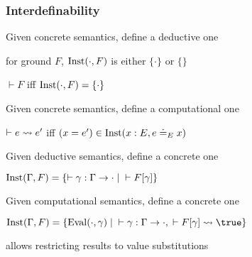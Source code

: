 \begin{frame}\frametitle{Interdefinability}
\begin{blockitems}{Given concrete semantics, define a deductive one}
\item for ground $F$, $\mathrm{Inst}(\cdot,F)$ is either $\{\cdot\}$ or $\{\}$
\item $\vdash F$ iff $\mathrm{Inst}(\cdot, F)=\{\cdot\}$
\end{blockitems}

\begin{blockitems}{Given concrete semantics, define a computational one}
\item $\vdash e\rightsquigarrow e'$ iff $(x=e')\in\mathrm{Inst}(x:E, e\doteq_E x)$
\end{blockitems}

\begin{blockitems}{Given deductive semantics, define a concrete one}
\item $\mathrm{Inst}(\Gamma,F)=\{\vdash \gamma:\Gamma\to\cdot \;|\;\vdash F[\gamma]\}$
\end{blockitems}

\begin{blockitems}{Given computational semantics, define a concrete one}
\item $\Inst(\Gamma,F)=\{\Eval(\cdot,\gamma) \;|\;\vdash \gamma:\Gamma\to\cdot, \;\vdash F[\gamma]\rewrites \true\}$
\item allows restricting results to value substitutions
\end{blockitems}
\end{frame}

